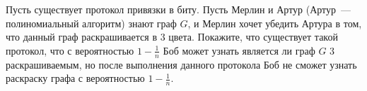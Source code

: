 Пусть существует протокол привязки в биту. Пусть Мерлин и Артур (Артур~--- полиномиальный алгоритм) знают
граф $G$, и Мерлин хочет убедить Артура в том, что данный граф раскрашивается в $3$ цвета. Покажите, что
существует такой протокол, что с вероятностью $1 - \frac{1}{n}$ Боб может узнать является ли граф $G$ $3$
раскрашиваемым, но после выполнения данного протокола Боб не сможет узнать раскраску графа с вероятностью
$1 - \frac{1}{n}$.

